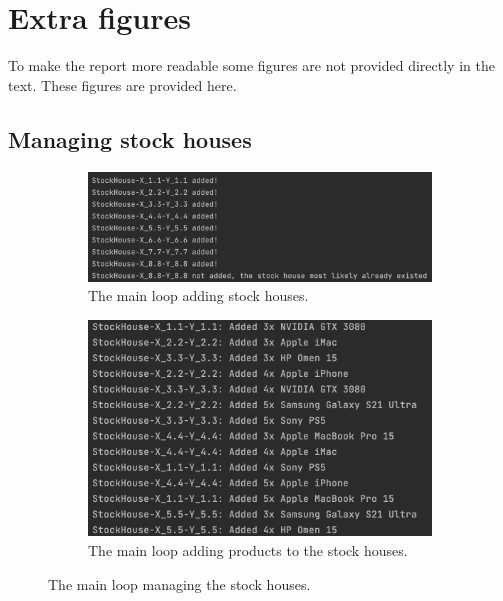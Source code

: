 \chapter*{Extra figures}
\label{ch:extra_figures}

To make the report more readable some figures are not provided directly in the text.
These figures are provided here.

\section*{Managing stock houses}

\begin{figure}[H]
     \centering
     \begin{subfigure}[b]{0.9\textwidth}
         \centering
         \includegraphics[width=\textwidth]{images/addStockHouses.png}
         \caption{The main loop adding stock houses.}
         \label{fig:adding_stockhouse}
     \end{subfigure}
     \hfill
     \begin{subfigure}[b]{0.9\textwidth}
         \centering
         \includegraphics[width=\textwidth]{images/addProducts.png}
         \caption{The main loop adding products to the stock houses.}
         \label{fig:adding_stock}
     \end{subfigure}
        \caption{The main loop managing the stock houses.}
        \label{fig:managing_stockhouse}
\end{figure}

